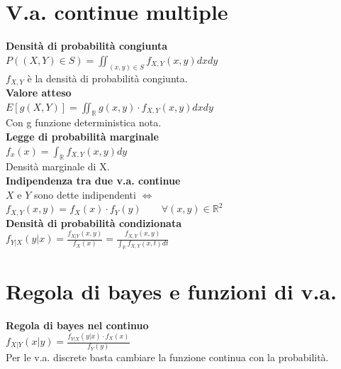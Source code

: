 \documentclass{article}
\begin{document}
\begin{multicols*}{3}
		\section{V.a. continue multiple}
		\textbf{Densità di probabilità congiunta}\\
		\(P((X,Y)\in S) = \iint_{(x,y)\in S}f_{X,Y} (x,y) dxdy \)\\ \(f_{X,Y} \) è la densità di probabilità congiunta.\\
		\textbf{Valore atteso}\\
		\(E[g(X,Y)] = \iint_{\mathbb{R}} g(x,y)\cdot f_{X,Y}(x,y) dxdy\) \\Con g funzione deterministica nota.\\
		\textbf{Legge di probabilità marginale}\\
		\(f_x(x) = \int_{\mathbb{R}}^{} f_{X,Y}(x,y) dy\)\\
		Densità marginale di X.\\
		\textbf{Indipendenza tra due v.a. continue}\\
		\(X\) e \(Y\) sono dette indipendenti \(\iff\) \(f_{X,Y}(x,y) = f_X(x)\cdot f_Y(y) \qquad \forall (x,y) \in \mathbb{R}^2\)\\
		\textbf{Densità di probabilità condizionata}\\
		\(f_{Y|X}(y|x) = \frac{f_{X|Y} (x,y)}{f_X (x)} = \frac{f_{X,Y} (x,y)}{\int_{\mathbb{R}} f_{X,Y} (x,t) dt}\)\\
		
		
		\section{Regola di bayes e funzioni di v.a.}
		\textbf{Regola di bayes nel continuo}\\
		\(f_{X|Y} (x|y) = \frac{f_{Y|X} (y|x)\cdot f_X(x)}{f_Y (y)}\)\\
		Per le v.a. discrete basta cambiare la funzione continua con la probabilità.\\

\end{multicols*}
\end{document}
